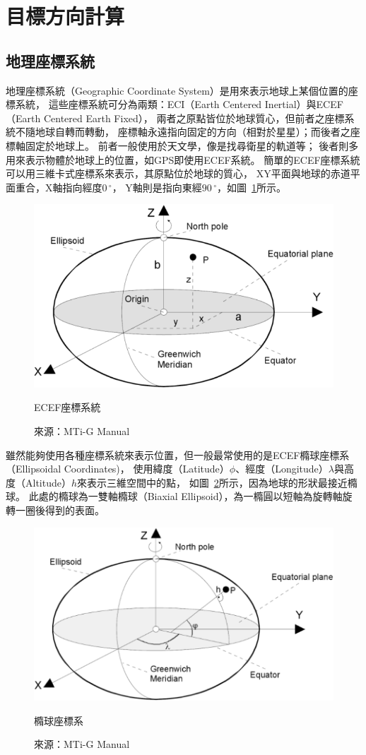 \section{目標方向計算}
\label{sec:target}

\subsection{地理座標系統}
地理座標系統（Geographic Coordinate System）是用來表示地球上某個位置的座標系統，
這些座標系統可分為兩類：ECI（Earth Centered Inertial）與ECEF（Earth Centered Earth Fixed），
兩者之原點皆位於地球質心，但前者之座標系統不隨地球自轉而轉動，
座標軸永遠指向固定的方向（相對於星星）；而後者之座標軸固定於地球上。
前者一般使用於天文學，像是找尋衛星的軌道等；
後者則多用來表示物體於地球上的位置，如GPS即使用ECEF系統。
簡單的ECEF座標系統可以用三維卡式座標系來表示，其原點位於地球的質心，
XY平面與地球的赤道平面重合，X軸指向經度$0\,^{\circ}$，
Y軸則是指向東經$90\,^{\circ}$，如圖~\ref{f:ecef}所示。
\begin{figure}[h!]
	\centering
	\includegraphics[width=12cm]{figures/algorithm/ECEF}
	\caption{ECEF座標系統}
	\caption*{來源：MTi-G Manual}
	\label{f:ecef}
\end{figure}

雖然能夠使用各種座標系統來表示位置，但一般最常使用的是ECEF橢球座標系（Ellipsoidal Coordinates)，
使用緯度（Latitude）$\phi$、經度（Longitude）$\lambda$與高度（Altitude）$h$來表示三維空間中的點，
如圖~\ref{f:ellipsoid}所示，因為地球的形狀最接近橢球。
此處的橢球為一雙軸橢球（Biaxial Ellipsoid），為一橢圓以短軸為旋轉軸旋轉一圈後得到的表面。
\begin{figure}[h!]
	\centering
	\includegraphics[width=12cm]{figures/algorithm/ellipsoid}
	\caption{橢球座標系}
	\caption*{來源：MTi-G Manual}
	\label{f:ellipsoid}
\end{figure}

